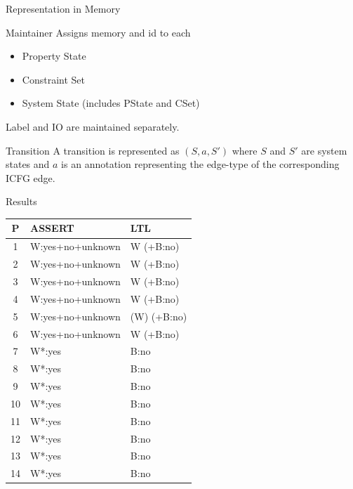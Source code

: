 \begin{frame}{Representation in Memory}

\begin{block}{Maintainer}
Assigns memory and id to each
\begin{itemize}
\item Property State
\item Constraint Set
\item System State (includes PState and CSet)
\end{itemize}

Label and IO are maintained separately.
\end{block}

\begin{block}{Transition}
A transition is represented as $(S,a,S')$ where $S$ and $S'$ are system states and $a$
is an annotation representing the edge-type of the corresponding ICFG edge.
\end{block}

\end{frame}

\begin{frame}{Results}
\begin{center}
\vspace{-0.2cm}
\begin{tabular}{|c|l|l|}\hline
P & ASSERT & LTL \\\hline\hline
1 & W:yes+no+unknown      & W (+B:no)\\\hline
2 & W:yes+no+unknown     & W (+B:no)\\\hline
3 & W:yes+no+unknown     & W (+B:no)\\\hline
4 & W:yes+no+unknown     & W (+B:no)\\\hline
5 & W:yes+no+unknown     & (W) (+B:no)\\\hline
6 & W:yes+no+unknown     & W (+B:no) \\\hline
7 & W*:yes     & B:no    \\\hline
8 & W*:yes     & B:no    \\\hline
9 & W*:yes     & B:no    \\\hline
10 & W*:yes     & B:no    \\\hline
11 & W*:yes     & B:no    \\\hline
12 & W*:yes     & B:no    \\\hline
13 & W*:yes     & B:no    \\\hline
14 & W*:yes     & B:no    \\\hline
\end{tabular}
\end{center}
\end{frame}

